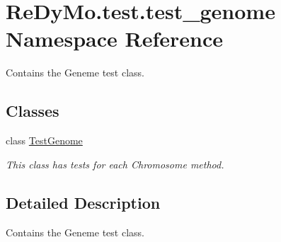 \hypertarget{namespaceReDyMo_1_1test_1_1test__genome}{}\section{Re\+Dy\+Mo.\+test.\+test\+\_\+genome Namespace Reference}
\label{namespaceReDyMo_1_1test_1_1test__genome}


Contains the Geneme test class.  


\subsection*{Classes}
\begin{DoxyCompactItemize}
\item 
class \mbox{\hyperlink{classReDyMo_1_1test_1_1test__genome_1_1TestGenome}{Test\+Genome}}
\begin{DoxyCompactList}\small\item\em This class has tests for each Chromosome method. \end{DoxyCompactList}\end{DoxyCompactItemize}


\subsection{Detailed Description}
Contains the Geneme test class. 